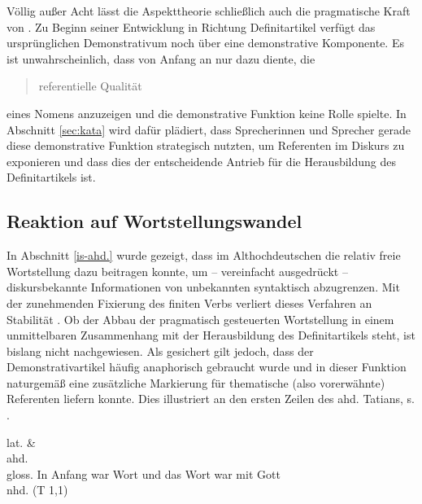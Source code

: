 Völlig außer Acht lässt die Aspekttheorie schließlich auch die pragmatische Kraft von . Zu Beginn seiner Entwicklung in Richtung Definitartikel verfügt das ursprünglichen Demonstrativum noch über eine demonstrative Komponente. Es ist unwahrscheinlich, dass  von Anfang an nur dazu diente, die \blockcquote[281]{Leiss2000}{referentielle Qualität} eines Nomens anzuzeigen und die demonstrative Funktion keine Rolle spielte. In Abschnitt \ref{sec:kata} wird dafür plädiert, dass Sprecherinnen und Sprecher gerade diese demonstrative Funktion strategisch nutzten, um Referenten im Diskurs zu exponieren und dass dies der entscheidende Antrieb für die Herausbildung des Definitartikels ist. 

\subsection{Reaktion auf Wortstellungswandel} \label{wortstellungswandel}

In Abschnitt \ref{is-ahd.} wurde gezeigt, dass im Althochdeutschen die relativ freie Wortstellung dazu beitragen konnte, um -- vereinfacht ausgedrückt -- diskursbekannte Informationen von unbekannten syntaktisch abzugrenzen. Mit der zunehmenden Fixierung des finiten Verbs verliert dieses Verfahren an Stabilität \parencite{Hinterholzl2010}. Ob der Abbau der pragmatisch gesteuerten Wortstellung in einem unmittelbaren Zusammenhang mit der Herausbildung des Definitartikels steht, ist bislang nicht nachgewiesen. Als gesichert gilt jedoch, dass der Demonstrativartikel häufig anaphorisch gebraucht wurde \parencite{Jager1918, Oubouzar1992} und in dieser Funktion naturgemäß eine zusätzliche Markierung für thematische (also vorerwähnte) Referenten liefern konnte. Dies illustriert \textcite[161]{Leiss2000} an den ersten Zeilen des ahd. Tatians, s. .

\begin{exe} 
\ex \label{ex:wort} 
\glll lat.      \& {}    \\
	ahd.           \\
	gloss. In Anfang war Wort und das Wort war mit Gott \\
	\trans nhd.   (T 1,1)
	\end{exe}

